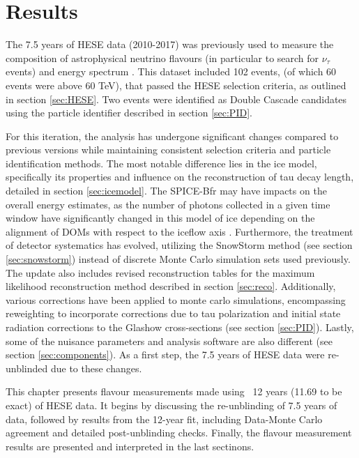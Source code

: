 \setchapterpreamble[u]{\margintoc}
\chapter{Results}
The 7.5 years of HESE data (2010-2017) was previously used to measure the composition of astrophysical neutrino flavours  (in particular to search for $\nu_{\tau}$ events) and energy spectrum . This dataset included 102 events, (of which 60 events were above 60 TeV), that passed the HESE selection criteria, as outlined in section \ref{sec:HESE}. Two events were identified as Double Cascade candidates using the particle identifier described in section \ref{sec:PID}. 

For this iteration, the analysis has undergone significant changes compared to previous versions while maintaining consistent selection criteria and particle identification methods. The most notable difference lies in the ice model, specifically its properties and influence on the reconstruction of tau decay length, detailed in section \ref{sec:icemodel}. The SPICE-Bfr may have impacts on the overall energy estimates, as the number of photons collected in a given time window have significantly changed in this model of ice depending on the alignment of DOMs with respect to the iceflow axis . Furthermore, the treatment of detector systematics has evolved, utilizing the SnowStorm method (see section \ref{sec:snowstorm}) instead of discrete Monte Carlo simulation sets used previously. The update also includes revised reconstruction tables  for the maximum likelihood reconstruction method described in section \ref{sec:reco}. Additionally, various corrections have been applied to monte carlo simulations, encompassing reweighting to incorporate corrections due to tau polarization and initial state radiation corrections to the Glashow cross-sections (see section \ref{sec:PID}). Lastly, some of the nuisance parameters and analysis software are also different (see section \ref{sec:components}). As a first step, the 7.5 years of HESE data were re-unblinded due to these changes.

This chapter presents flavour measurements made using ~12 years (11.69 to be exact) of HESE data. It begins by discussing the re-unblinding of 7.5 years of data, followed by results from the 12-year fit, including Data-Monte Carlo agreement and detailed post-unblinding checks. Finally, the flavour measurement results are presented and interpreted in the last sectinons.

